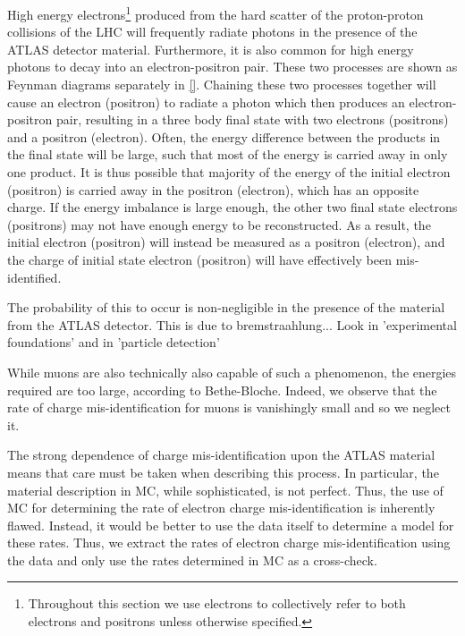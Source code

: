 

High energy electrons\footnote{Throughout this section we use 
electrons to collectively refer to both electrons and positrons
unless otherwise specified.} produced from the 
hard scatter of the proton-proton
collisions of the LHC
will frequently radiate photons in the presence of the ATLAS
detector material. Furthermore, it is also common %
for high energy photons to decay into an electron-positron pair.
These two processes are shown as Feynman diagrams 
separately in \fig\ref{}.
Chaining these two processes together will cause 
an electron (positron) to radiate a photon which then produces an
electron-positron pair, resulting in a three body final state with
two electrons (positrons) and a positron (electron).
Often, the energy difference between the products in the final state will
be large, such that most of the energy is carried away in only one
product.  It is thus possible that majority of the energy of the initial
electron (positron) is carried away in the positron (electron), which
has an opposite charge.  If the energy imbalance is large enough,
the other two final state electrons (positrons) may not have enough
energy to be reconstructed. As a result, the initial electron
(positron) will instead be measured as a positron (electron), and the 
charge of initial state electron (positron) will have effectively 
been mis-identified. 


The probability of this to occur is non-negligible in the presence of the material 
from the ATLAS detector. This is due to bremstraahlung...
Look in 'experimental foundations' and in 'particle detection'


While muons are also technically also capable of such a phenomenon, the 
energies required are too large, according to Bethe-Bloche.
Indeed, we observe that the rate of charge mis-identification for muons
is vanishingly small and so we neglect it. %

The strong dependence of charge mis-identification 
upon the ATLAS material means that care must be
taken when describing this process. In particular, the material 
description in MC, while sophisticated, is not perfect. Thus, the use of MC
for determining the rate of electron charge mis-identification is inherently
flawed. Instead, it would be better to use the data itself to determine
a model for these rates. 
Thus, we extract the rates of electron charge 
mis-identification using the data and only use the rates determined
in MC as a cross-check.

